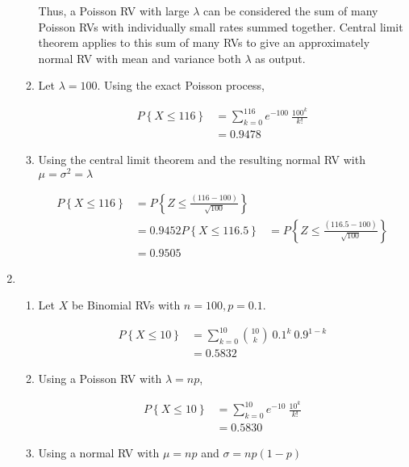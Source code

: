 \begin{enumerate}
\begin{enumerate}
			Thus, a Poisson RV with large $\lambda$ can be considered the sum of many Poisson RVs with individually small rates summed together. Central limit theorem applies to this sum of many RVs to give an approximately normal RV with mean and variance both $ \lambda $ as output.
			
			\item Let $ \lambda = 100 $. Using the exact Poisson process,
			
			\begin{align}
				P \left\{X \leq 116 \right\} &= \sum\limits_{k=0}^{116} e^{-100}\ \frac{100^k}{k!} \nonumber \\
				&= 0.9478
			\end{align}
			
			\item Using the central limit theorem and the resulting normal RV with $ \mu = \sigma^2 = \lambda $
			
			\begin{align}
				P \left\{X \leq 116 \right\} &= P \left\{ Z \leq \frac{(116 - 100)}{\sqrt{100}} \right\} \nonumber \\
				&= 0.9452
				P \left\{X \leq 116.5 \right\} &= P \left\{ Z \leq \frac{(116.5 - 100)}{\sqrt{100}} \right\} \nonumber \\
				&= 0.9505
			\end{align}
		\end{enumerate}
	
	
	\item
	
		\begin{enumerate}
			\item Let $ X $ be Binomial RVs with  $ n = 100, p = 0.1 $.
			
			\begin{align}
				P \left\{X \leq 10 \right\} &= \sum\limits_{k=0}^{10} \binom{10}{k}\ 0.1^k\ 0.9^{1-k} \nonumber \\
				&= 0.5832
			\end{align}
			
			\item Using a Poisson RV with $ \lambda = np $,
			
			\begin{align}
				P \left\{X \leq 10 \right\} &= \sum\limits_{k=0}^{10} e^{-10}\ \frac{10^k}{k!} \nonumber \\
				&= 0.5830
			\end{align}
			
			\item Using a normal RV with $ \mu = np$ and $ \sigma = np(1-p) $
			

\end{enumerate}
\end{enumerate}
